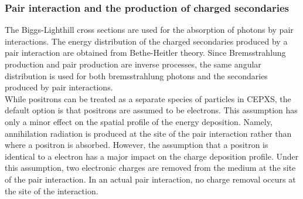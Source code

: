 \subsubsection{Pair interaction and the production of charged secondaries}
The Biggs-Lighthill cross sections are used for the absorption of photons by
pair interactions. The energy distribution of the charged secondaries produced
by a pair interaction are obtained from Bethe-Heitler theory. Since
Bremsstrahlung production and pair production are inverse processes, the same
angular distribution is used for both bremsstrahlung photons and the
secondaries produced by pair interactions.\\
While positrons can be treated as a separate species of particles in CEPXS,
the default option is that positrons are assumed to be electrons. This
assumption has only a minor effect on the spatial profile of the energy
deposition. Namely, annihilation radiation is produced at the site of the pair 
interaction rather than where a positron is absorbed. However, the
assumption that a positron is identical to a electron has a major impact on
the charge deposition profile. Under this assumption, two electronic charges
are removed from the medium at the site  of the pair interaction. In an actual
pair interaction, no charge removal occurs at the site of the interaction.

